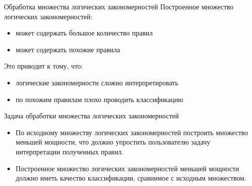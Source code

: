 \documentclass[utf8]{beamer}
\begin{document}
\begin{frame}{Обработка множества логических закономерностей}
  Построенное множество логических закономерностей:
  \begin{itemize}
  \item может содержать большое количество правил
  \item может содержать похожие правила
  \end{itemize}
  Это приводит к тому, что:
  \begin{itemize}
  \item логические закономерности сложно интерпретировать
  \item по похожим правилам плохо проводить классификацию
  \end{itemize}
  \begin{block}{Задача обработки множества логических закономерностей}
    \begin{itemize}
      \item По исходному множеству логических закономерностей
        построить множество меньшей мощности, что должно упростить
        пользователю задачу интерпретации полученных правил.
      \item Построенное множество логических закономерностей меньшей
        мощности должно иметь качество классификации, сравнимое с
        исходным множеством.
      \end{itemize}
  \end{block}
\end{frame}
\end{document}

